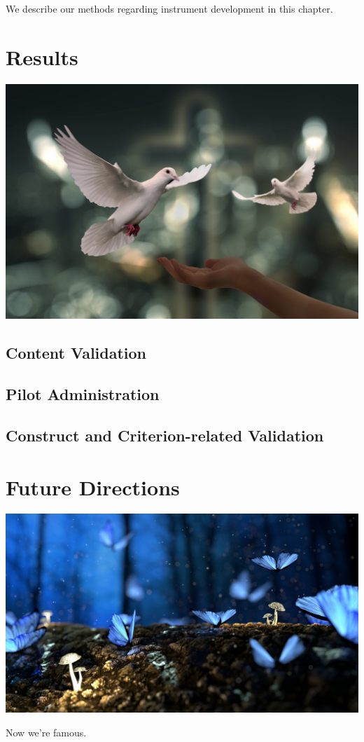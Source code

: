 \documentclass[
]{book}
\begin{document}
We describe our methods regarding instrument development in this chapter.

\hypertarget{results}{%
\chapter{Results}\label{results}}

\includegraphics{doves-g750d44923_1920.jpg}

\hypertarget{content-validation}{%
\section{Content Validation}\label{content-validation}}

\hypertarget{pilot-administration}{%
\section{Pilot Administration}\label{pilot-administration}}

\hypertarget{construct-and-criterion-related-validation}{%
\section{Construct and Criterion-related Validation}\label{construct-and-criterion-related-validation}}

\hypertarget{future-directions}{%
\chapter{Future Directions}\label{future-directions}}

\includegraphics{fantasy-g653fba516_1920.jpg}

Now we're famous.

  
\end{document}
